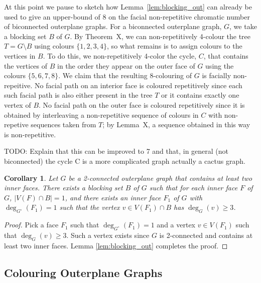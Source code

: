 \documentclass{patmorin}
\newcommand{\wdual}[1]{#1^{\circ}}
\newtheorem{corollary}[theorem]{Corollary}
\begin{document}
At this point we pause to sketch how Lemma~\ref{lem:blocking_out}
can already be used to give an upper-bound of 8 on the facial
non-repetitive chromatic number of biconnected outerplane graphs.
For a biconnected outerplane graph, $G$, we take a blocking set $B$
of $G$.  By Theorem~X, we can non-repetitively 4-colour the tree
$T=G\setminus B$ using colours $\{1,2,3,4\}$, so what remains is to assign
colours to the vertices in $B$.  To do this, we non-repetitively 4-color
the cycle, $C$, that contains the vertices of $B$ in the order they appear on
the outer face of $G$ using the colours $\{5,6,7,8\}$.  We claim that
the resulting 8-colouring of $G$ is facially non-repeitive.  No facial
path on an interior face is coloured repetitively since each such facial path
is also either present in the tree $T$ or it contains exactly one
vertex of $B$.  No facial path on the outer face is coloured repetitively
since it is obtained by interleaving a non-repetitive sequence of colours in $C$ with non-repetive sequences taken from $T$; by Lemma~X, a sequence obtained in this way is non-repetitive.

TODO: Explain that this can be improved to 7 and that, in general (not
biconnected)
 the cycle C is a more complicated graph
 actually a cactus
graph.
 

 


\begin{corollary}
 Let $G$ be a 2-connected outerplane graph that contains at least two inner faces. There exists a blocking set $B$ of $G$ such that for each inner face $F$ of $G$, $|V(F) \cap B|=1$, and there exists an inner face $F_1$ of $G$ with $\deg_{\wdual{G}}(F_1)=1$ such that the vertex $v \in V(F_1) \cap B$ has $\deg_G(v) \geq 3$.
  \label{cor:blocking_out_select}
\end{corollary}

\begin{proof}
  Pick a face $F_1$ such that $\deg_{\wdual{G}}(F_1)=1$ and a vertex $v \in V(F_1)$ such that $\deg_G(v) \geq 3$. Such a vertex exists since $G$ is 2-connected and contains at least two inner faces. Lemma \ref{lem:blocking_out} completes the proof. 
\end{proof}

\subsection{Colouring Outerplane Graphs}
\end{document}
